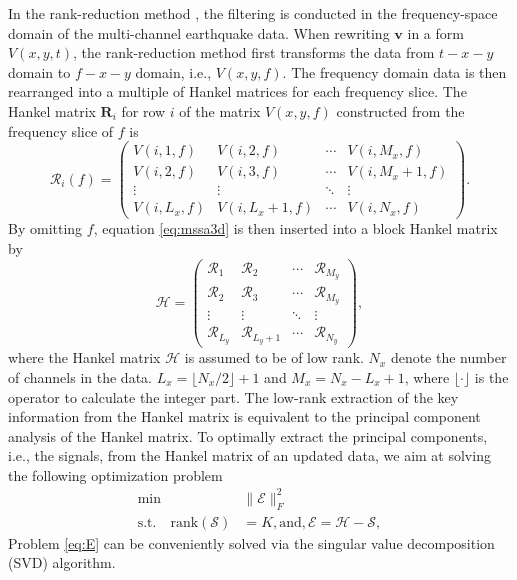 In the rank-reduction method \cite[]{mssa}, the filtering is conducted in the frequency-space domain of the multi-channel earthquake data. When rewriting $\mathbf{v}$ in a  form $V(x,y,t)$, the rank-reduction method first transforms the data from $t-x-y$ domain to $f-x-y$ domain, i.e., $V(x,y,f)$. The frequency domain data is then rearranged into a multiple of  Hankel matrices for each frequency slice. The Hankel matrix $\mathbf{R}_i$ for row $i$ of the matrix $V(x,y,f)$ constructed from the frequency slice of $f$ is
\begin{equation}
\label{eq:mssa3d}
\mathcal{R}_i(f)=\left(\begin{array}{cccc}
V(i,1,f) & V(i,2,f) & \cdots &V(i,M_x,f) \\
V(i,2,f) & V(i,3,f)  &\cdots &V(i,M_x+1,f) \\
\vdots & \vdots &\ddots &\vdots \\
V(i,L_x,f)&V(i,L_x+1,f) &\cdots&V(i,N_x,f)
\end{array}
\right).
\end{equation}
By omitting $f$, equation \ref{eq:mssa3d} is then inserted into a block Hankel matrix by
\begin{equation}
\label{eq:mssa3d2}
\mathcal{H}=\left(\begin{array}{cccc}
\mathcal{R}_1 & \mathcal{R}_2 & \cdots &\mathcal{R}_{M_y}\\
\mathcal{R}_2 & \mathcal{R}_3  &\cdots &\mathcal{R}_{M_y}\\
\vdots & \vdots &\ddots &\vdots \\
\mathcal{R}_{L_y} &\mathcal{R}_{L_y+1} &\cdots&\mathcal{R}_{N_y}
\end{array}
\right),
\end{equation}
where the Hankel matrix $\mathcal{H}$ is assumed to be of low rank. $N_x$  denote the number of channels in the data. $L_x=\lfloor N_x/2 \rfloor+1$ and $M_x=N_x-L_x+1$, where $\lfloor \cdot \rfloor$ is the operator to calculate the integer part.  The low-rank extraction of the key information from the Hankel matrix is equivalent to the principal component analysis of the Hankel matrix. To optimally extract the principal components, i.e., the signals, from the Hankel matrix of an updated data, we aim at solving the following optimization problem
\begin{equation}
\label{eq:E}
\begin{split}
\min &\parallel \mathcal{E} \parallel_F^2 \\
\text{s.t.} \quad \text{rank}(\mathcal{S}) & =K, \text{and}, \mathcal{E}=\mathcal{H}-\mathcal{S},
\end{split}
\end{equation}
Problem \ref{eq:E} can be conveniently solved via the singular value decomposition (SVD) algorithm. 

